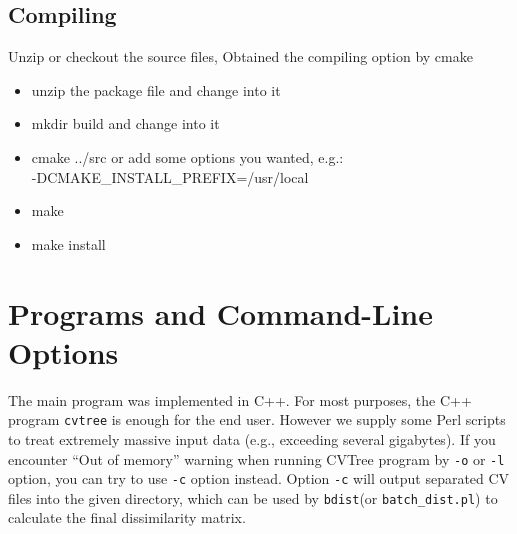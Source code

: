 \documentclass[a4paper,12pt]{article}
\begin{document}
\subsection{Compiling}
Unzip or checkout the source files, Obtained the compiling option by
cmake
\begin{itemize}
	\item unzip the package file and change into it
	\item mkdir build and change into it
	\item cmake ../src or add some options you wanted, e.g.:\\ -DCMAKE\_INSTALL\_PREFIX=/usr/local
	\item make
	\item make install
\end{itemize}

\section{Programs and Command-Line Options}

The main program was implemented in C++. For most purposes, the C++
program \verb!cvtree! is enough for the end user. However we supply some
Perl scripts to treat extremely massive input data (e.g., exceeding
several gigabytes). If you encounter ``Out of memory'' warning when
running CVTree program by \verb!-o! or \verb!-l! option, you can try to
use \verb!-c! option instead. Option \verb!-c! will output separated CV
files into the given directory, which can be used by \verb!bdist!(or
\verb!batch_dist.pl!) to calculate the final dissimilarity matrix.
\end{document}
